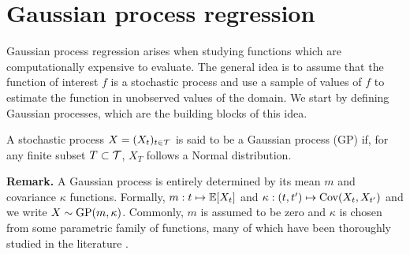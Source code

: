 

\section{Gaussian process regression} \label{section:GPs}


Gaussian process regression arises when studying functions which are computationally expensive to evaluate. The general idea is to assume that the function of interest $f$ is a stochastic process and use a sample of values of $f$ to estimate the function in unobserved values of the domain. We start by defining Gaussian processes, which are the building blocks of this idea.

\begin{definition} \label{def:GP}
	A stochastic process $X = (X_t)_{t \in \mathcal{T}}$ is said to be a Gaussian process (GP) if, for any finite subset $T \subset \mathcal{T}$, $X_T$ follows a Normal distribution. 
\end{definition}


\textbf{Remark.} A Gaussian process is entirely determined by its mean $m$ and covariance $\kappa$ functions. Formally, $m: t \mapsto \mathbb{E}[X_t]$ and $\kappa: (t, t') \mapsto \mathrm{Cov}(X_t, X_{t'})$ and we write $X \sim \mathrm{GP} (m, \kappa)$. Commonly, $m$ is assumed to be zero and $\kappa$ is chosen from some parametric family of functions, many of which have been thoroughly studied in the literature \cite[see][Ch.~4]{RasmussenWilliams:2006}. \\




